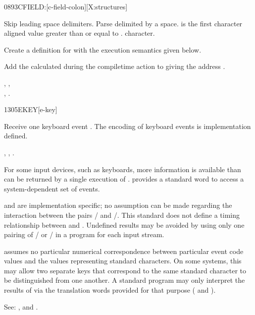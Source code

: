 \begin{worddef}{0893}{CFIELD:}[c-field-colon][X:structures]
\item {}

	Skip leading space delimiters. Parse  delimited by
	a space.  is the first character aligned value
	greater than or equal to .  
	character.

	Create a definition for  with the execution semantics
	given below.

\execute[name]

	Add the  calculated during the compiletime action to
	 giving the address .

\see {},
	, \\
	,
	.
\end{worddef}


\begin{worddef}{1305}{EKEY}[e-key]
\item {}

	Receive one keyboard event . The encoding of keyboard events
	is implementation defined.

\see {},
	,
	.


	\begin{rationale} %
		For some input devices, such as keyboards, more information is
		available than can be returned by a single execution of
		.   provides a standard word to access a
		system-dependent set of events.

		 and  are implementation specific; no
		assumption can be made regarding the interaction between the
		pairs / and /.
		This standard does not define a timing relationship between
		 and .  Undefined results may be
		avoided by using only one pairing of / 
		or / in a program for each input
		stream.

		 assumes no particular numerical correspondence
		between particular event code values and the values
		representing standard characters.  On some systems, this may
		allow two separate keys that correspond to the same standard
		character to be distinguished from one another.  A standard
		program may only interpret the results of  via the
		translation words provided for that purpose
		( and ).

		See: ,  and
		.
	\end{rationale}
\end{worddef}


